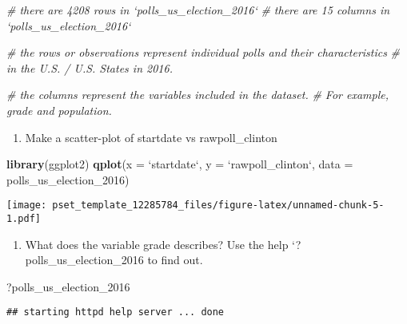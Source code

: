 \documentclass[
]{article}
\newenvironment{Shaded}{\begin{snugshade}}{\end{snugshade}}
\newcommand{\CommentTok}[1]{\textcolor[rgb]{0.56,0.35,0.01}{\textit{#1}}}
\newcommand{\DataTypeTok}[1]{\textcolor[rgb]{0.13,0.29,0.53}{#1}}
\newcommand{\DecValTok}[1]{\textcolor[rgb]{0.00,0.00,0.81}{#1}}
\newcommand{\KeywordTok}[1]{\textcolor[rgb]{0.13,0.29,0.53}{\textbf{#1}}}
\newcommand{\NormalTok}[1]{#1}
\newcommand{\StringTok}[1]{\textcolor[rgb]{0.31,0.60,0.02}{#1}}
\providecommand{\tightlist}{%
  \setlength{\itemsep}{0pt}\setlength{\parskip}{0pt}}
\begin{document}
\begin{Shaded}
\begin{Highlighting}[]
\CommentTok{# there are 4208 rows in `polls_us_election_2016`}
\CommentTok{# there are 15 columns in `polls_us_election_2016`}
 
\CommentTok{# the rows or observations represent individual polls and their characteristics }
\CommentTok{# in the U.S. / U.S. States in 2016.}

\CommentTok{# the columns represent the variables included in the dataset. }
\CommentTok{# For example, grade and population.}
\end{Highlighting}
\end{Shaded}

\begin{enumerate}
\def\labelenumi{\arabic{enumi}.}
\tightlist
\item
  Make a scatter-plot of startdate vs rawpoll\_clinton
\end{enumerate}

\begin{Shaded}
\begin{Highlighting}[]
\KeywordTok{library}\NormalTok{(ggplot2)}
\KeywordTok{qplot}\NormalTok{(}\DataTypeTok{x =} \StringTok{`}\DataTypeTok{startdate}\StringTok{`}\NormalTok{, }\DataTypeTok{y =} \StringTok{`}\DataTypeTok{rawpoll_clinton}\StringTok{`}\NormalTok{, }\DataTypeTok{data =}\NormalTok{ polls_us_election_}\DecValTok{2016}\NormalTok{)}
\end{Highlighting}
\end{Shaded}

\texttt{[image: pset\_template\_12285784\_files/figure-latex/unnamed-chunk-5-1.pdf]}

\begin{enumerate}
\def\labelenumi{\arabic{enumi}.}
\tightlist
\item
  What does the variable grade describes? Use the help
  `?polls\_us\_election\_2016 to find out.
\end{enumerate}

\begin{Shaded}
\begin{Highlighting}[]
\NormalTok{?polls_us_election_}\DecValTok{2016}
\end{Highlighting}
\end{Shaded}

\begin{verbatim}
## starting httpd help server ... done
\end{verbatim}
\end{document}
